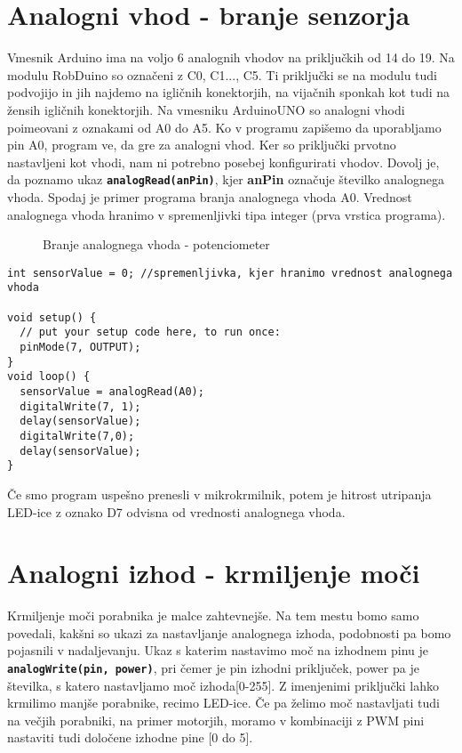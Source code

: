 \documentclass[11pt,a4paper]{article}
\begin{document}
\section{Analogni vhod - branje senzorja}
Vmesnik Arduino ima na voljo 6 analognih vhodov na priključkih od 14 do 19. Na modulu RobDuino so označeni z C0, C1..., C5. Ti priključki se na modulu tudi podvojijo in jih najdemo na igličnih konektorjih, na vijačnih sponkah kot tudi na žensih igličnih konektorjih.
Na vmesniku ArduinoUNO so analogni vhodi poimeovani z oznakami od A0 do A5. Ko v programu zapišemo da uporabljamo pin A0, program ve, da gre za analogni vhod. Ker so priključki prvotno nastavljeni kot vhodi, nam ni potrebno posebej konfigurirati vhodov. Dovolj je, da poznamo ukaz \texttt{\textbf{analogRead(anPin)}}, kjer \textbf{anPin} označuje številko analognega vhoda. Spodaj je primer programa branja analognega vhoda A0. Vrednost analognega vhoda hranimo v spremenljivki tipa integer (prva vrstica programa).  


\begin{figure}[h!] \centering
{}
\caption{Branje analognega vhoda - potenciometer}\label{slika:potenciometer}
\end{figure}


\begin{lstlisting}
int sensorValue = 0; //spremenljivka, kjer hranimo vrednost analognega vhoda

void setup() {
  // put your setup code here, to run once:
  pinMode(7, OUTPUT);
}
void loop() {  
  sensorValue = analogRead(A0);
  digitalWrite(7, 1);
  delay(sensorValue);
  digitalWrite(7,0);
  delay(sensorValue);  
}
\end{lstlisting}
Če smo program uspešno prenesli v mikrokrmilnik, potem je hitrost utripanja LED-ice z oznako D7 odvisna od vrednosti analognega vhoda. 

\section{Analogni izhod - krmiljenje moči}
Krmiljenje moči porabnika je malce zahtevnejše. Na tem mestu bomo samo povedali, kakšni so ukazi za nastavljanje analognega izhoda, podobnosti pa bomo pojasnili v nadaljevanju.
Ukaz s katerim nastavimo moč na izhodnem pinu je \texttt{\textbf{analogWrite(pin, power)}}, pri čemer je pin izhodni priključek, power pa je številka, s katero nastavljamo moč izhoda[0-255].
Z imenjenimi priključki lahko krmilimo manjše porabnike, recimo LED-ice. Če pa želimo moč nastavljati tudi na večjih porabniki, na primer motorjih, moramo v kombinaciji z PWM pini nastaviti tudi določene izhodne pine [0 do 5]. 
\end{document}
